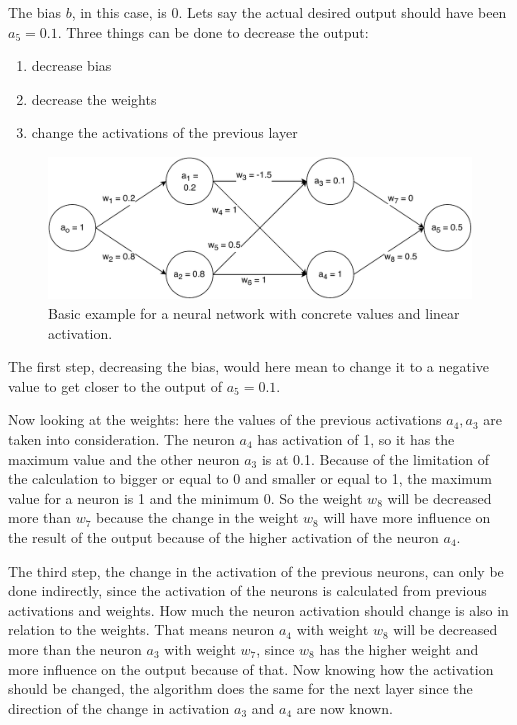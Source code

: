 The bias $b$, in this case, is 0.
Lets say the actual desired output should have been $a_5 = 0.1$.
Three things can be done to decrease the output:
\begin{enumerate}
	\item decrease bias
	\item decrease the weights
	\item change the activations of the previous layer
\end{enumerate}

\begin{figure}
	\centering
	\includegraphics[width=0.7\linewidth]{"Pictures/Basic Neural Network"}
	\caption{Basic example for a neural network with concrete values and linear activation.}
	\label{fig:basic-neural-network}
\end{figure}

The first step, decreasing the bias, would here mean to change it to a negative value to get closer to the output of $a_5 = 0.1$.

Now looking at the weights: here the values of the previous activations $a_4, a_3$ are taken into consideration.
The neuron $a_4$ has activation of 1, so it has the maximum value and the other neuron $a_3$ is at 0.1.
Because of the limitation of the calculation to bigger or equal to 0 and smaller or equal to 1, the maximum value for a neuron is 1 and the minimum 0.
So the weight $w_8$ will be decreased more than $w_7$ because the change in the weight $w_8$ will have more influence on the result of the output because of the higher activation of the neuron $a_4$.

The third step, the change in the activation of the previous neurons, can only be done indirectly, since the activation of the neurons is calculated from previous activations and weights.
How much the neuron activation should change is also in relation to the weights.
That means neuron $a_4$ with weight $w_8$ will be decreased more than the neuron $a_3$ with weight $w_7$, since $w_8$ has the higher weight and more influence on the output because of that.
Now knowing how the activation should be changed, the algorithm does the same for the next layer since the direction of the change in activation $a_3$ and $a_4$ are now known.

